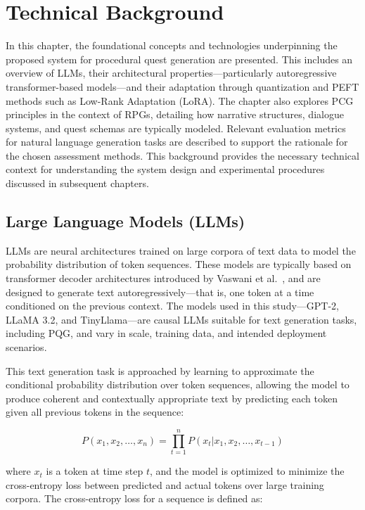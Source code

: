 \clearpage

\chapter{Technical Background}

In this chapter, the foundational concepts and technologies underpinning the proposed system for procedural
quest generation are presented. This includes an overview of
LLMs, their architectural properties—particularly autoregressive transformer-based models—and
their adaptation through quantization and PEFT methods such as Low-Rank
Adaptation (LoRA). The chapter also explores PCG principles in the context of RPGs,
detailing how narrative structures, dialogue systems, and quest schemas are typically
modeled. Relevant evaluation metrics for natural language generation tasks are described
to support the rationale for the chosen assessment methods. This background provides
the necessary technical context for understanding the system design and experimental
procedures discussed in subsequent chapters.

\section{Large Language Models (LLMs)}

LLMs are neural architectures trained on large corpora of text data to model the probability
distribution of token sequences. These models are typically based on transformer
decoder architectures introduced by Vaswani et al.~\cite{vaswani2017attention}, and are designed to generate
text autoregressively—that is, one token at a time conditioned on the previous context.
The models used in this study—GPT-2, LLaMA 3.2, and TinyLlama—are causal LLMs
suitable for text generation tasks, including PQG, and vary in scale, training data, and
intended deployment scenarios.

This text generation task is approached by learning to approximate the conditional
probability distribution over token sequences, allowing the model to produce coherent and
contextually appropriate text by predicting each token given all previous tokens in the
sequence:

\begin{equation}
  P(x_1, x_2, \dots, x_n) = \prod_{t=1}^n P(x_t | x_1, x_2, \dots, x_{t-1})
  \label{tokengen}
\end{equation}

where $x_t$ is a token at time step $t$, and the model is optimized to minimize the cross-entropy
loss between predicted and actual tokens over large training corpora. The cross-entropy
loss for a sequence is defined as:

